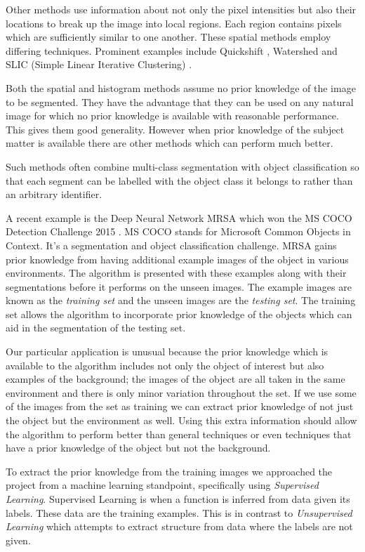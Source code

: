 \documentclass[12pt]{IIBproject}
\begin{document}
Other methods use information about not only the pixel intensities but also their locations to break up the image into local regions. Each region contains pixels which are sufficiently similar to one another. These spatial methods employ differing techniques.  Prominent examples include Quickshift \cite{vedaldi2008quick}, Watershed \cite{vincent1991watersheds} and SLIC (Simple Linear Iterative Clustering) \cite{achanta2012slic}.

 Both the spatial and histogram methods assume no prior knowledge of the image to be segmented. They have the advantage that they can be used on any natural image for which no prior knowledge is available with reasonable performance. This gives them good generality. However when prior knowledge of the subject matter is available there are other methods which can perform much better. 
 
 Such methods often combine multi-class segmentation with object classification so that each segment can be labelled with the object class it belongs to rather than an arbitrary identifier. 
 
 A recent example is the Deep Neural Network MRSA \cite{he2015deep} which won the MS COCO Detection Challenge 2015 \cite{mscoco}. MS COCO stands for Microsoft Common Objects in Context. It's a segmentation and object classification challenge. MRSA gains prior knowledge from having additional example images of the object in various environments. The algorithm is presented with these examples along with their segmentations before it performs on the unseen images. The example images are known as the \emph{training set} and the unseen images are the \emph{testing set}. The training set allows the algorithm to incorporate prior knowledge of the objects which can aid in the segmentation of the testing set.

Our particular application is unusual because the prior knowledge which is available to the algorithm includes not only the object of interest but also examples of the background; the images of the object are all taken in the same environment and there is only minor variation throughout the set. If we use some of the images from the set as training we can extract prior knowledge of not just the object but the environment as well. Using this extra information should allow the algorithm to perform better than general techniques or even techniques that have a prior knowledge of the object but not the background. 

To extract the prior knowledge from the training images we approached the project from a machine learning standpoint, specifically using \emph{Supervised Learning}. Supervised Learning is when a function is inferred from data given its labels. These data are the training examples. This is in contrast to \emph{Unsupervised Learning} which attempts to extract structure from data where the labels are not given. 
\end{document}
